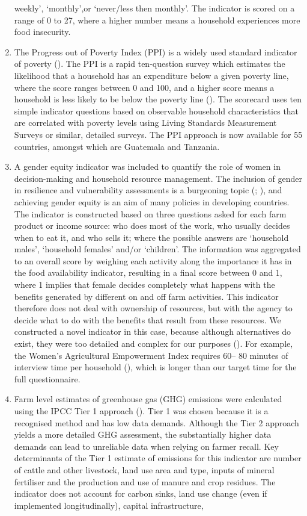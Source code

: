 \begin{enumerate}[label=\arabic*., start = 1]
weekly', `monthly',or `never/less then monthly'. The indicator is scored on a range of 0 to 27, where a higher number means a household experiences more food insecurity.
\item The Progress out of Poverty Index (PPI) is a widely used standard indicator of poverty (\citealp{Desiere201510}). The PPI is a rapid ten-question survey which estimates the likelihood that a household has an expenditure below a given poverty line, where the score ranges between 0 and 100, and a higher score means a household is less likely to be below the poverty line (\citealp{GrameenFoundation2015}). The scorecard uses ten simple indicator questions based on observable household characteristics that are correlated with poverty levels using Living Standards Measurement Surveys or similar, detailed surveys. The PPI approach is now available for 55 countries, amongst which are Guatemala and Tanzania.
\item A gender equity indicator was included to quantify the role of women in decision-making and household resource management. The inclusion of gender in resilience and vulnerability assessments is a burgeoning topic (\citealp{Smyth2015405}; \citealp{Morchain2015481}), and achieving gender equity is an aim of many policies in developing countries. The indicator is constructed based on three questions asked for each farm product or income source: who does most of the work, who usually decides when to eat it, and who sells it; where the possible answers are `household males', `household females' and/or `children'. The information was aggregated to an overall score by weighing each activity along the importance it has in the food availability indicator, resulting in a ﬁnal score between 0 and 1, where 1 implies that female decides completely what happens with the beneﬁts generated by different on and off farm activities. This indicator therefore does not deal with ownership of resources, but with the agency to decide what to do with the beneﬁts that result from these resources. We constructed a novel indicator in this case, because although alternatives do exist, they were too detailed and complex for our purposes (\citealp{Johnson2015}). For example, the Women's Agricultural Empowerment Index requires 60– 80 minutes of interview time per household (\citealp{Alkire2013}), which is longer than our target time for the full questionnaire.

\item Farm level estimates of greenhouse gas (GHG) emissions were calculated using the IPCC Tier 1 approach (\citealp{IPCC2006}). Tier 1 was chosen because it is a recognised method and has low data demands. Although the Tier 2 approach yields a more detailed GHG assessment, the substantially higher data demands can lead to unreliable data when relying on farmer recall. Key determinants of the Tier 1 estimate of emissions for this indicator are number of cattle and other livestock, land use area and type, inputs of mineral fertiliser and the production and use of manure and crop residues. The indicator does not account for carbon sinks, land use change (even if implemented longitudinally), capital infrastructure,
\end{enumerate}
